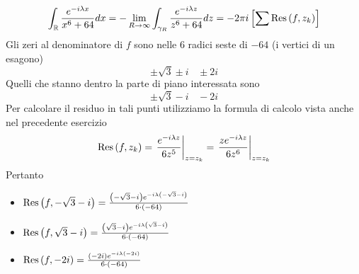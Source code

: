 \begin{equation*}
\int_{\mathbb{R}}\frac{e^{- i\lambda x}}{x^{6} + 64} dx = -\lim\limits_{R\rightarrow \infty}\int_{\gamma_{R}}\frac{e^{- i\lambda z}}{z^{6} + 64} dz = -2\pi i\left[\sum \operatorname{Res} \left(f, z_{k}\right)\right]
\end{equation*}
Gli zeri al denominatore di $f$ sono nelle $6$ radici seste di $ - 64$ (i vertici di un esagono)
\begin{equation*}
\pm \sqrt{3} \pm i\ \ \ \ \pm 2i
\end{equation*}
Quelli che stanno dentro la parte di piano interessata sono
\begin{equation*}
\pm \sqrt{3} - i\ \ \ \ - 2i
\end{equation*}
Per calcolare il residuo in tali punti utilizziamo la formula di calcolo vista anche nel precedente esercizio
\begin{equation*}
\operatorname{Res} \left(f, z_{k}\right) = \left. \frac{e^{- i\lambda z}}{6z^{5}}\right|_{z = z_{k}} = \left. \frac{ze^{- i\lambda z}}{6z^{6}}\right|_{z = z_{k}}
\end{equation*}
Pertanto
\begin{itemize}
\item $\operatorname{Res} \left(f, - \sqrt{3} - i\right) = \frac{\left(- \sqrt{3} - i\right) e^{- i\lambda \left(- \sqrt{3} - i\right)}}{6 \cdot \left(- 64\right)}$
\item $\operatorname{Res} \left(f, \sqrt{3} - i\right) = \frac{\left(\sqrt{3} - i\right) e^{- i\lambda \left(\sqrt{3} - i\right)}}{6 \cdot \left(- 64\right)}$
\item $\operatorname{Res} \left(f, - 2i\right) = \frac{\left(- 2i\right) e^{- i\lambda \left(- 2i\right)}}{6 \cdot \left(- 64\right)}$
\end{itemize}

